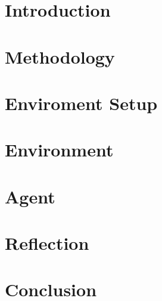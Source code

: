 \documentclass{report}
\begin{document}


\tableofcontents

\chapter{Introduction}\label{ch:intro}


\chapter{Methodology}\label{ch:methodology}


\chapter{Enviroment Setup}\label{ch:environment-setup}


\chapter{Environment}\label{ch:environment}


\chapter{Agent}\label{ch:agent}


\chapter{Reflection}\label{ch:reflection}


\chapter{Conclusion}\label{ch:conclusion}


\printnoidxglossaries{}



\end{document}
